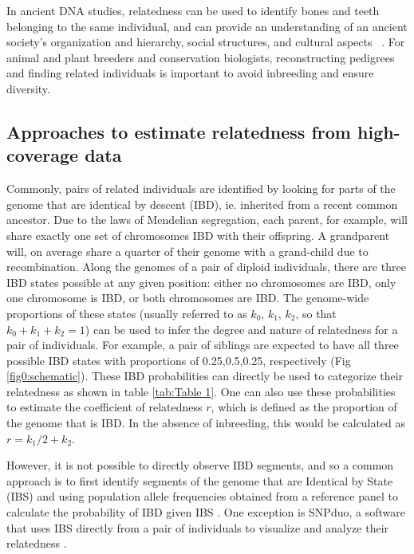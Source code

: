 \documentclass[12pt, letterpaper]{article}
\begin{document}
In ancient DNA studies, relatedness can be used to identify bones and teeth belonging to the same individual, and can provide an understanding of an ancient society's organization and hierarchy, social structures, and cultural aspects ~\cite{baca_ancient_2012,mittnik_KINship-based_2019,sikora_ancient_2017}. For animal and plant breeders and conservation biologists, reconstructing pedigrees and finding related individuals is important to avoid inbreeding and ensure diversity. ~\cite{habier_impact_2007,oliehoek_estimating_2006,kardos_measuring_2015} 


\subsection{Approaches to estimate relatedness from high-coverage data}

Commonly, pairs of related individuals are identified by looking for parts of the genome that are identical by descent (IBD), ie. inherited from a recent common ancestor. Due to the laws of Mendelian segregation, each parent, for example, will share exactly one set of chromosomes IBD with their offspring. A grandparent will, on average share a quarter of their genome with a grand-child due to recombination. Along the genomes of a pair of diploid individuals, there are three IBD states possible at any given position: either no chromosomes are IBD, only one chromosome is IBD, or both chromosomes are IBD. The genome-wide proportions of these states (usually referred to as $k_0$, $k_1$, $k_2$, so that $k_0+k_1+k_2=1$) can be used to infer the degree and nature of relatedness for a pair of individuals. For example, a pair of siblings are expected to have all three possible IBD states with proportions of 0.25,0.5,0.25, respectively (Fig \ref{fig0:schematic}). These IBD probabilities can directly be used to categorize their relatedness as shown in table \ref{tab:Table 1}. One can also use these probabilities to estimate the coefficient of relatedness $r$, which is defined as the proportion of the genome that is IBD. In the absence of inbreeding, this would be calculated as $r= k_1/2 + k_2$.

However, it is not possible to directly observe IBD segments, and so a common approach is to first identify segments of the genome that are Identical by State (IBS) and using population allele frequencies obtained from a reference panel to calculate the probability of IBD given IBS \cite{vai_KINship_2020, boehnke_accurate_1997,lynch_estimation_1999, albrechtsen_natural_2010, purcell_plink_2007}. One exception is SNPduo, a software that uses IBS directly from a pair of individuals to visualize and analyze their relatedness \cite{roberson_visualization_2009}.
\end{document}
